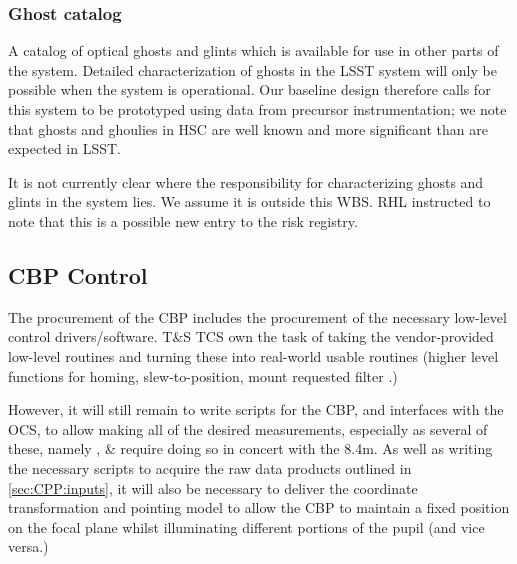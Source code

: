 \subsubsection{Ghost catalog}\label{sec:CPP:output:GhostCatalog}
A catalog of optical ghosts and glints which is available for use in other parts of the system. Detailed characterization of ghosts in the LSST system will only be possible when the system is operational. Our baseline design therefore calls for this system to be prototyped using data from precursor instrumentation; we note that ghosts and ghoulies in \eg HSC are well known and more significant than are expected in LSST.
\begin{note}
It is not currently clear where the responsibility for characterizing ghosts and glints in the system lies. We assume it is outside this WBS. RHL instructed to note that this is a possible new entry to the risk registry.
\end{note}





\subsection{CBP Control}\label{sec:CPP:CBP_control}
The procurement of the CBP includes the procurement of the necessary low-level control drivers/software. T\&S TCS own the task of taking the vendor-provided low-level routines and turning these into real-world usable routines (higher level functions for \eg homing, slew-to-position, mount requested filter \etc.)

However, it will still remain to write scripts for the CBP, and interfaces with the OCS, to allow making all of the desired measurements, especially as several of these, namely \xxx, \xxx \& \xxx require doing so in concert with the 8.4m.
\alg As well as writing the necessary scripts to acquire the raw data products outlined in \secsymbol\ref{sec:CPP:inputs}, it will also be necessary to deliver the coordinate transformation and pointing model to allow the CBP to maintain a fixed position on the focal plane whilst illuminating different portions of the pupil (and vice versa.)

















